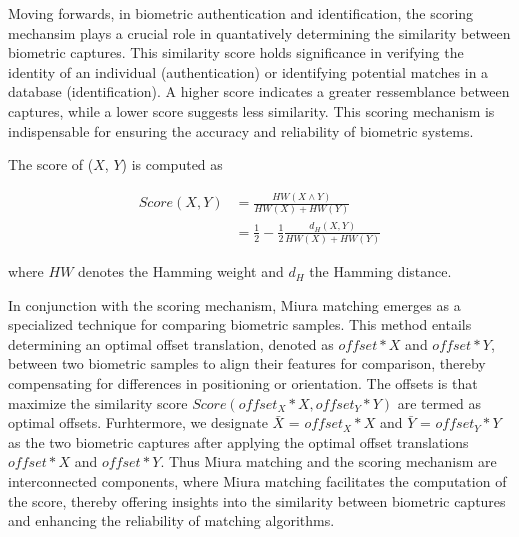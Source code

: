 Moving forwards, in biometric authentication and identification, the scoring mechansim plays a crucial role in quantatively determining the similarity between biometric captures. This similarity score holds significance in verifying the identity of an individual (authentication) or identifying potential matches in a database (identification). A higher score indicates a greater ressemblance between captures, while a lower score suggests less similarity. This scoring mechanism is indispensable for ensuring the accuracy and reliability of biometric systems. 

The score of (\(X\), \(Y\)) is computed as

\begin{equation} \label{eq:score}
    \begin{aligned}
        Score(X, Y) &= \frac{HW(X \land Y)}{HW(X) + HW(Y)}\\
        &= \frac{1}{2}-\frac{1}{2}\frac{d_H(X, Y)}{HW(X) + HW(Y)}
    \end{aligned}
\end{equation}

where \(HW\) denotes the Hamming weight and \(d_H\) the Hamming distance. 

In conjunction with the scoring mechanism, Miura matching emerges as a specialized technique for comparing biometric samples. This method entails determining an optimal offset translation, denoted as \(offset * X\) and \(offset * Y\), between two biometric samples to align their features for comparison, thereby compensating for differences in positioning or orientation. The offsets is that maximize the similarity score \(Score(offset_X * X, offset_Y * Y)\) are termed as optimal offsets. Furhtermore, we designate \(\bar{X}\) = \(offset_X * X\) and \(\bar{Y}\) = \(offset_Y * Y\) as the two biometric captures after applying the optimal offset translations \(offset * X\) and \(offset * Y\).
Thus Miura matching and the scoring mechanism are interconnected components, where Miura matching facilitates the computation of the score, thereby offering insights into the similarity between biometric captures and enhancing the reliability of matching algorithms. 






